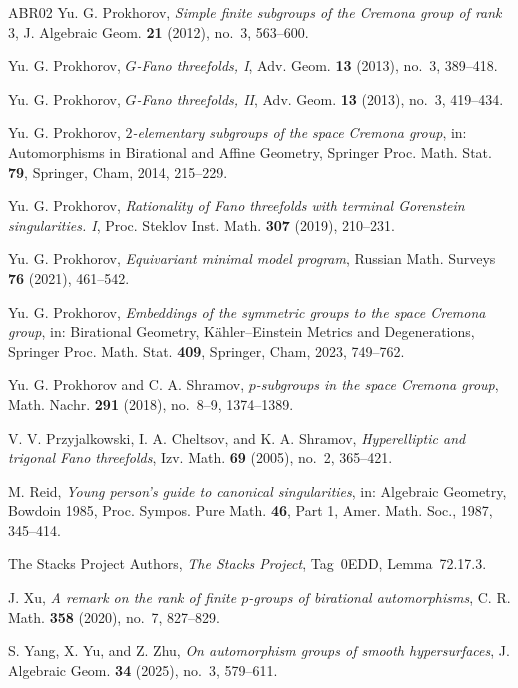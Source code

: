 \documentclass[10pt,oneside,reqno]{amsart}
\numberwithin{equation}{section}
\theoremstyle{definition}
\begin{document}
\begin{thebibliography}{ABR02}
Yu. G. Prokhorov,
\emph{Simple finite subgroups of the Cremona group of rank $3$},
J. Algebraic Geom. \textbf{21} (2012), no.~3, 563--600.

Yu. G. Prokhorov,
\emph{$G$-Fano threefolds, I},
Adv. Geom. \textbf{13} (2013), no.~3, 389--418.

Yu. G. Prokhorov,
\emph{$G$-Fano threefolds, II},
Adv. Geom. \textbf{13} (2013), no.~3, 419--434.

Yu. G. Prokhorov,
\emph{$2$-elementary subgroups of the space Cremona group},
in: Automorphisms in Birational and Affine Geometry,
Springer Proc. Math. Stat. \textbf{79},
Springer, Cham, 2014, 215--229.

Yu. G. Prokhorov,
\emph{Rationality of Fano threefolds with terminal Gorenstein
singularities. I},
Proc. Steklov Inst. Math. \textbf{307} (2019), 210--231.

Yu. G. Prokhorov,
\emph{Equivariant minimal model program},
Russian Math. Surveys \textbf{76} (2021), 461--542.

Yu. G. Prokhorov,
\emph{Embeddings of the symmetric groups to the space Cremona group},
in: Birational Geometry, K\"ahler--Einstein Metrics and Degenerations,
Springer Proc. Math. Stat. \textbf{409}, Springer, Cham, 2023, 749--762.

Yu. G. Prokhorov and C. A. Shramov,
\emph{$p$-subgroups in the space Cremona group},
Math. Nachr. \textbf{291} (2018), no.~8--9, 1374--1389.

V. V. Przyjalkowski, I. A. Cheltsov, and K. A. Shramov,
\emph{Hyperelliptic and trigonal Fano threefolds},
Izv. Math. \textbf{69} (2005), no.~2, 365--421.

M. Reid,
\emph{Young person's guide to canonical singularities},
in: Algebraic Geometry, Bowdoin 1985, Proc. Sympos. Pure Math.
\textbf{46}, Part 1, Amer. Math. Soc., 1987, 345--414.

The Stacks Project Authors,
\emph{The Stacks Project},
Tag~0EDD, Lemma~72.17.3.

J. Xu,
\emph{A remark on the rank of finite $p$-groups of birational
automorphisms},
C. R. Math. \textbf{358} (2020), no.~7, 827--829.

S. Yang, X. Yu, and Z. Zhu,
\emph{On automorphism groups of smooth hypersurfaces},
J. Algebraic Geom. \textbf{34} (2025), no.~3, 579--611.

\end{thebibliography}

\Addresses
\end{document}

